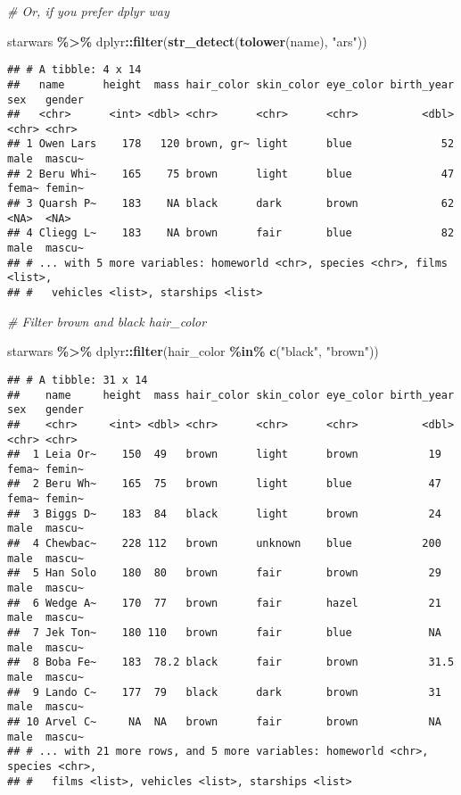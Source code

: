 \documentclass[
]{book}
\newenvironment{Shaded}{\begin{snugshade}}{\end{snugshade}}
\newcommand{\CommentTok}[1]{\textcolor[rgb]{0.56,0.35,0.01}{\textit{#1}}}
\newcommand{\KeywordTok}[1]{\textcolor[rgb]{0.13,0.29,0.53}{\textbf{#1}}}
\newcommand{\NormalTok}[1]{#1}
\newcommand{\OperatorTok}[1]{\textcolor[rgb]{0.81,0.36,0.00}{\textbf{#1}}}
\newcommand{\StringTok}[1]{\textcolor[rgb]{0.31,0.60,0.02}{#1}}
\begin{document}
\begin{Shaded}
\begin{Highlighting}[]
\CommentTok{\# Or, if you prefer dplyr way}

\NormalTok{starwars }\OperatorTok{\%\textgreater{}\%}
\StringTok{  }\NormalTok{dplyr}\OperatorTok{::}\KeywordTok{filter}\NormalTok{(}\KeywordTok{str\_detect}\NormalTok{(}\KeywordTok{tolower}\NormalTok{(name), }\StringTok{"ars"}\NormalTok{))}
\end{Highlighting}
\end{Shaded}

\begin{verbatim}
## # A tibble: 4 x 14
##   name      height  mass hair_color skin_color eye_color birth_year sex   gender
##   <chr>      <int> <dbl> <chr>      <chr>      <chr>          <dbl> <chr> <chr> 
## 1 Owen Lars    178   120 brown, gr~ light      blue              52 male  mascu~
## 2 Beru Whi~    165    75 brown      light      blue              47 fema~ femin~
## 3 Quarsh P~    183    NA black      dark       brown             62 <NA>  <NA>  
## 4 Cliegg L~    183    NA brown      fair       blue              82 male  mascu~
## # ... with 5 more variables: homeworld <chr>, species <chr>, films <list>,
## #   vehicles <list>, starships <list>
\end{verbatim}

\begin{Shaded}
\begin{Highlighting}[]
\CommentTok{\# Filter brown and black hair\_color}

\NormalTok{starwars }\OperatorTok{\%\textgreater{}\%}
\StringTok{  }\NormalTok{dplyr}\OperatorTok{::}\KeywordTok{filter}\NormalTok{(hair\_color }\OperatorTok{\%in\%}\StringTok{ }\KeywordTok{c}\NormalTok{(}\StringTok{"black"}\NormalTok{, }\StringTok{"brown"}\NormalTok{))}
\end{Highlighting}
\end{Shaded}

\begin{verbatim}
## # A tibble: 31 x 14
##    name     height  mass hair_color skin_color eye_color birth_year sex   gender
##    <chr>     <int> <dbl> <chr>      <chr>      <chr>          <dbl> <chr> <chr> 
##  1 Leia Or~    150  49   brown      light      brown           19   fema~ femin~
##  2 Beru Wh~    165  75   brown      light      blue            47   fema~ femin~
##  3 Biggs D~    183  84   black      light      brown           24   male  mascu~
##  4 Chewbac~    228 112   brown      unknown    blue           200   male  mascu~
##  5 Han Solo    180  80   brown      fair       brown           29   male  mascu~
##  6 Wedge A~    170  77   brown      fair       hazel           21   male  mascu~
##  7 Jek Ton~    180 110   brown      fair       blue            NA   male  mascu~
##  8 Boba Fe~    183  78.2 black      fair       brown           31.5 male  mascu~
##  9 Lando C~    177  79   black      dark       brown           31   male  mascu~
## 10 Arvel C~     NA  NA   brown      fair       brown           NA   male  mascu~
## # ... with 21 more rows, and 5 more variables: homeworld <chr>, species <chr>,
## #   films <list>, vehicles <list>, starships <list>
\end{verbatim}
\end{document}
